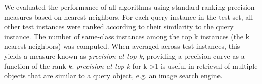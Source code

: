 \documentclass{article} %
\begin{document}
\begin{figure}[!h]
\begin{floatrow}
           \end{floatrow}
\end{figure}
     
We evaluated the performance of all algorithms using standard ranking precision measures based on nearest neighbors. For each query instance in the test set, all other test instances were ranked according to their similarity to the query instance. The number of same-class instances
among the top k instances (the k nearest neighbors) was computed. When averaged across test
instances, this yields a measure known as \textit{precision-at-top-k},
providing a precision curve as a function of the rank $k$. \textit{precision-at-top-k} for k >1 is useful in retrieval of multiple objects that are similar to a query object, e.g. an image search engine.
\end{document}
